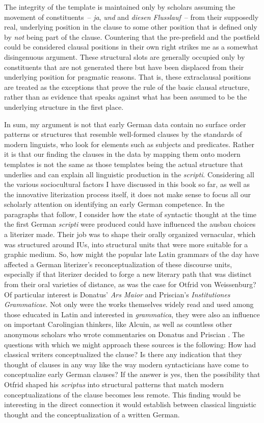 \noindent The integrity of the template is maintained only by scholars assuming the movement of constituents~-- \textit{ja}, \textit{und} and \textit{diesen Flusslauf}~-- from their supposedly real, underlying position in the clause to some other position that is defined only by \textit{not} being part of the clause. Countering that the pre-prefield and the postfield could be considered clausal positions in their own right strikes me as a somewhat disingenuous argument. These structural slots are generally occupied only by constituents that are not generated there but have been displaced from their underlying position for pragmatic reasons. That is, these extraclausal positions are treated as the exceptions that prove the rule of the basic clausal structure, rather than as evidence that speaks against what has been assumed to be the underlying structure in the first place.

In sum, my argument is not that early German data contain no surface order patterns or structures that resemble well-formed clauses by the standards of modern linguists, who look for elements such as subjects and predicates. Rather it is that our finding the clauses in the data by mapping them onto modern templates is not the same as those templates being the actual structure that underlies and can explain all linguistic production in the \textit{scripti}. Considering all the various sociocultural factors I have discussed in this book so far, as well as the innovative literization process itself, it does not make sense to focus all our scholarly attention on identifying an early German competence. In the paragraphs that follow, I consider how the state of syntactic thought at the time the first German \textit{scripti} were produced could have influenced the ausbau choices a literizer made. Their job was to shape their orally organized vernacular, which was structured around IUs, into structural units that were more suitable for a graphic medium. So, how might the popular late Latin grammars of the day have affected a German literizer’s reconceptualization of these discourse units, especially if that literizer decided to forge a new literary path that was distinct from their oral varieties of distance, as was the case for Otfrid von Weissenburg? Of particular interest is Donatus’ \textit{Ars Maior} and Priscian’s \textit{Institutiones Grammaticae}. Not only were the works themselves widely read and used among those educated in Latin and interested in \textit{grammatica}, they were also an influence on important Carolingian thinkers, like Alcuin, as well as countless other anonymous scholars who wrote commentaries on Donatus and Priscian \citep[145]{Luhtala1993}. The questions with which we might approach these sources is the following: How had classical writers conceptualized the clause? Is there any indication that they thought of clauses in any way like the way modern syntacticians have come to conceptualize early German clauses? If the answer is yes, then the possibility that Otfrid shaped his \textit{scriptus} into structural patterns that match modern conceptualizations of the clause becomes less remote. This finding would be interesting in the direct connection it would establish between classical linguistic thought and the conceptualization of a written German.

